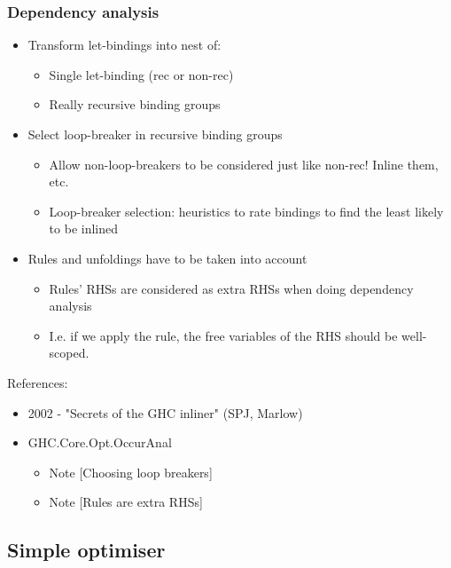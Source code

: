 \documentclass[aspectratio=169]{beamer}
\begin{document}
\begin{frame}
  \frametitle{Dependency analysis}

  \begin{itemize}
    \item Transform let-bindings into nest of:
      \begin{itemize}
        \item Single let-binding (rec or non-rec)
        \item Really recursive binding groups
      \end{itemize}

    \item Select loop-breaker in recursive binding groups
      \begin{itemize}
        \item Allow non-loop-breakers to be considered just like non-rec!
          Inline them, etc.
        \item Loop-breaker selection: heuristics to rate bindings to find
          the least likely to be inlined
      \end{itemize}

    \item Rules and unfoldings have to be taken into account
      \begin{itemize}
        \item Rules' RHSs are considered as extra RHSs when doing dependency
          analysis
        \item I.e. if we apply the rule, the free variables of the RHS should be well-scoped.
      \end{itemize}
  \end{itemize}

  References:
  \begin{itemize}
    \item 2002 - "Secrets of the GHC inliner" (SPJ, Marlow)
    \item GHC.Core.Opt.OccurAnal
      \begin{itemize}
        \item Note [Choosing loop breakers]
        \item Note [Rules are extra RHSs]
      \end{itemize}
  \end{itemize}
\end{frame}

\subsection{Simple optimiser}
\end{document}

